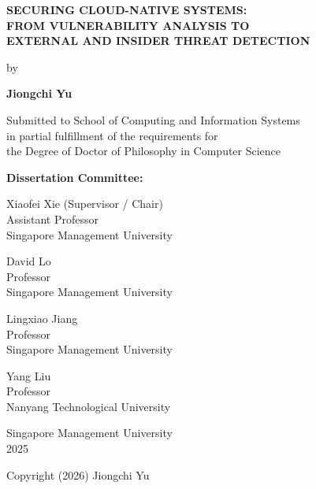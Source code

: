 \documentclass[titlepage,a4paper,12pt,thmsb]{report}
\begin{document}
\begin{titlepage}
\thispagestyle{empty}

\begin{center}

{\bf SECURING CLOUD-NATIVE SYSTEMS: \\[.1cm] FROM VULNERABILITY ANALYSIS TO\\[.1cm]
EXTERNAL AND INSIDER THREAT DETECTION}

\vspace{.5cm} %

{\normalsize by} %

\vspace{0.1cm}

{\bf Jiongchi Yu}

\vspace{.5cm}

{\small Submitted to School of Computing and Information Systems \\ in partial fulfillment of the requirements for \\ the Degree of Doctor of Philosophy in Computer Science}

\vspace{.5cm}

{\normalsize \bf Dissertation Committee:}

\vspace{-0.4cm}

{\small
\begin{center}
Xiaofei Xie (Supervisor / Chair) \\
Assistant Professor \\
Singapore Management University

David Lo \\
Professor\\
Singapore Management University

Lingxiao Jiang \\
Professor\\
Singapore Management University

Yang Liu \\
Professor\\
Nanyang Technological University
\end{center}
}

\vfill

{\normalsize Singapore Management University \\
2025}

\vspace{0.3cm}

{\normalsize Copyright (2026) Jiongchi Yu}

\end{center}

\end{titlepage}
\newpage
\end{document}
